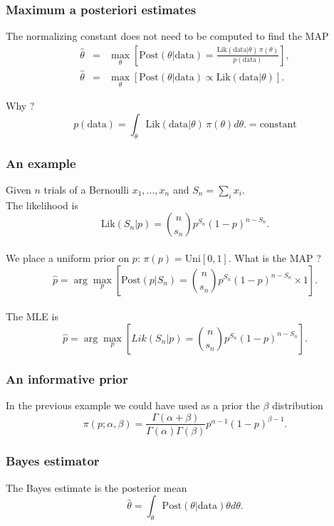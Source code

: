 \begin{frame}[fragile]\frametitle{Maximum a posteriori estimates}

The normalizing constant does not need to be computed to find
the MAP
\begin{eqnarray*}
\hat{\theta} &= &\max_\theta \left[\mbox{Post}(\theta|\mbox{data}) =  \frac{\mbox{Lik}(\mbox{data}|\theta) \, \pi(\theta)}{p(\mbox{data})}\right],\\
\hat{\theta} &= &\max_\theta \left[\mbox{Post}(\theta|\mbox{data})
  \propto  \mbox{Lik}(\mbox{data}|\theta)\right]. 
\end{eqnarray*}

Why ? 
$$p(\mbox{data}) = \int_\theta \mbox{Lik}(\mbox{data}|\theta) \,
  \pi(\theta) d\theta. = \mbox{constant}$$

 \end{frame}



\begin{frame}[fragile]\frametitle{An example}

Given $n$ trials of a Bernoulli $x_1,...,x_n$ and
$S_n = \sum_i  x_i$. \\
The likelihood is
$$\mbox{Lik}(S_n|p) = \binom{n}{s_n} p^{S_n}(1-p)^{n-S_n}.$$ \\ 

We place a uniform prior on $p$: $\pi(p) = \mbox{Uni}[0,1]$. 
What is the MAP ? 
$$\hat{p} = \arg \max_p \left[\mbox{Post}(p|S_n) = \binom{n}{s_n}
  p^{S_n}(1-p)^{n-S_n} \times 1\right].$$ \\ 

The MLE is
$$\hat{p} = \arg \max_p \left[Lik(S_n|p) = \binom{n}{s_n} p^{S_n}(1-p)^{n-S_n}\right].$$ 

\end{frame}

\begin{frame}[fragile]\frametitle{An informative prior}

In the previous example we could have used as a prior
the $\beta$ distribution
$$\pi(p;\alpha,\beta) = \frac{\Gamma(\alpha+\beta)}{\Gamma(\alpha)\Gamma(\beta)}p^{\alpha-1}(1-p)^{\beta-1}.$$
\end{frame}

\begin{frame}[fragile]\frametitle{Bayes estimator}

\begin{defn}
The Bayes estimate is the posterior mean
$$ \hat{\theta} = \int_\theta \mbox{Post}(\theta|\mbox{data}) \theta d\theta.$$ \end{defn}
\end{frame}


